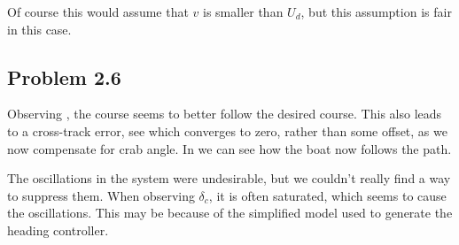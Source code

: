 Of course this would assume that $v$ is smaller than $U_d$, but this assumption is fair in this case. 

\subsection*{Problem 2.6}
Observing , the course seems to better follow the desired course. This also leads to a cross-track error, see  which converges to zero, rather than some offset, as we now compensate for crab angle. In  we can see how the boat now follows the path. 

The oscillations in the system were undesirable, but we couldn't really find a way to suppress them. When observing $\delta_c$, it is often saturated, which seems to cause the oscillations. This may be because of the simplified model used to generate the heading controller. 

